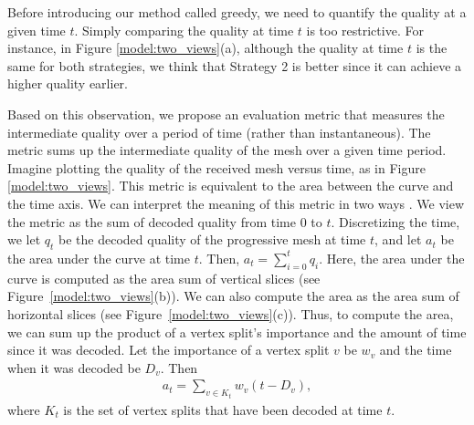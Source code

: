     Before introducing our method called greedy, 
    we need to quantify the quality at 
    a given time $t$. 
    Simply comparing the %
    quality at time $t$ 
    is too restrictive.
    For instance, in Figure
    \ref{model:two_views}(a), although the quality at time $t$ is
    the same for both strategies, we think that Strategy 2 is
    better since it can achieve a higher quality earlier.

    Based on this observation, we propose an evaluation
    metric that measures the intermediate quality over a
    period of time (rather than instantaneous).  The metric
    sums up the intermediate quality of the mesh over a
    given time period.  Imagine plotting the quality of the
    received mesh versus time, as in Figure
    \ref{model:two_views}.  This metric is equivalent to the
    area between the curve and the time axis.  We can interpret
    the meaning of this metric in two
    ways .  We view
    the metric as the sum of decoded quality from time $0$ to
    $t$.  Discretizing the time, we let $q_t$ be the decoded
    quality of the progressive mesh at time $t$, and let
    $a_t$ be the area under the curve at time $t$.  Then,
    $a_t = \sum_{i=0}^t q_i$.  Here, the area under the curve
    is computed as the area sum of vertical slices (see Figure~\ref{model:two_views}(b)).
    We can also compute the area as the area sum of
    horizontal slices (see Figure~\ref{model:two_views}(c)).  Thus,
    to compute the area, we can sum up the product of a
    vertex split's importance and the amount of time since
    it was decoded.
    Let the importance of a vertex split $v$ be $w_v$ and the time when
    it was decoded be $D_v$.  Then
    \begin{eqnarray}\label{e:model:quality}
    a_t = \sum_{v \in K_t} w_v (t - D_v),
    \end{eqnarray}
    where $K_t$ is the set of vertex splits that
    have been decoded at time $t$.

